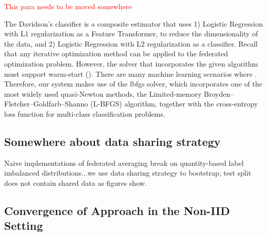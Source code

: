 \documentclass[letterpaper]{article} %
\begin{document}
\textcolor{red}{This para needs to be moved somewhere}

The Davidson's classifier is a composite estimator that uses 1) Logistic Regression with L1 regularization as a Feature Transformer, to reduce the dimensionality of the data, and 2) Logistic Regression with L2 regularization as a classifier. Recall that any iterative optimization method can be applied to the federated optimization problem. However, the solver that incorporates the given algorithm must support warm-start (). There are many machine learning scenarios where . Therefore, our system makes use of the lbfgs solver, which incorporates one of the most widely used quasi-Newton methods, the Limited-memory Broyden–Fletcher–Goldfarb–Shanno (L-BFGS) algorithm, together with the cross-entropy loss function for multi-class classification problems.

\subsection{Somewhere about data sharing strategy}
Naive implementations of federated averaging break on quantity-based label imbalanced distributions...we use data sharing strategy to bootstrap, test split does not contain shared data as figures show.

\subsection{Convergence of Approach in the Non-IID Setting}
\end{document}
